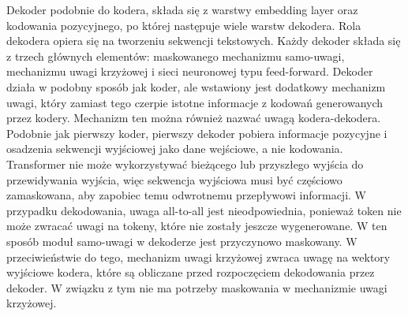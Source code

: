 \documentclass[12pt,a4paper,twoside]{book} %
\begin{document}
Dekoder podobnie do kodera, składa się z warstwy embedding layer oraz kodowania pozycyjnego, po której następuje wiele warstw dekodera.
Rola dekodera opiera się na tworzeniu sekwencji tekstowych.
Każdy dekoder składa się z trzech głównych elementów: maskowanego mechanizmu samo-uwagi, mechanizmu uwagi krzyżowej i sieci neuronowej typu feed-forward.
Dekoder działa w podobny sposób jak koder, ale wstawiony jest dodatkowy mechanizm uwagi, który zamiast tego czerpie istotne informacje z kodowań generowanych przez kodery. 
Mechanizm ten można również nazwać uwagą kodera-dekodera.
Podobnie jak pierwszy koder, pierwszy dekoder pobiera informacje pozycyjne i osadzenia sekwencji wyjściowej jako dane wejściowe, a nie kodowania.
Transformer nie może wykorzystywać bieżącego lub przyszłego wyjścia do przewidywania wyjścia, więc sekwencja wyjściowa musi być częściowo zamaskowana, aby zapobiec temu odwrotnemu przepływowi informacji. 
W przypadku dekodowania, uwaga all-to-all jest nieodpowiednia, ponieważ token nie może zwracać uwagi na tokeny, które nie zostały jeszcze wygenerowane.
W ten sposób moduł samo-uwagi w dekoderze jest przyczynowo maskowany.
W przeciwieństwie do tego, mechanizm uwagi krzyżowej zwraca uwagę na wektory wyjściowe kodera, które są obliczane przed rozpoczęciem dekodowania przez dekoder.
W związku z tym nie ma potrzeby maskowania w mechanizmie uwagi krzyżowej.
\end{document}

